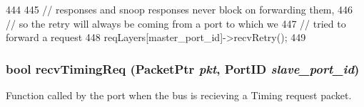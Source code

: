 \begin{DoxyCode}
444 {
445     // responses and snoop responses never block on forwarding them,
446     // so the retry will always be coming from a port to which we
447     // tried to forward a request
448     reqLayers[master_port_id]->recvRetry();
449 }
\end{DoxyCode}
\hypertarget{classCoherentBus_a8e2d7ccc3adb605e763f2bd1c64e5128}{
\subsubsection[{recvTimingReq}]{\setlength{\rightskip}{0pt plus 5cm}bool recvTimingReq ({\bf PacketPtr} {\em pkt}, \/  {\bf PortID} {\em slave\_\-port\_\-id})}}
\label{classCoherentBus_a8e2d7ccc3adb605e763f2bd1c64e5128}
Function called by the port when the bus is recieving a Timing request packet. 


